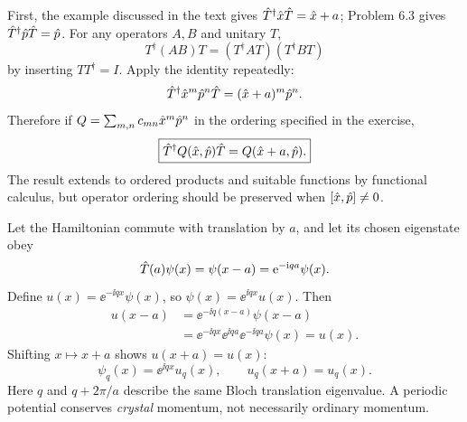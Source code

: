 First, the example discussed in the text gives
$\hat T^\dagger\hat x\hat T=\hat x+a$; Problem 6.3 gives
$\hat T^\dagger\hat p\hat T=\hat p$.
For any operators $A,B$ and unitary $T$,
\[
T^\dagger(AB)T=
(T^\dagger AT)(T^\dagger BT)
\]
by inserting $TT^\dagger=I$.
Apply the identity repeatedly:
\[
\hat T^\dagger \hat x^m\hat p^n\hat T
=(\hat x+a)^m\hat p^n.
\]
Therefore if $Q=\sum_{m,n}c_{mn}\hat x^m\hat p^n$
in the ordering specified in the exercise,
\begin{equation}
\boxed{\hat T^\dagger Q(\hat x,\hat p)\hat T
=Q(\hat x+a,\hat p).}
\end{equation}
The result extends to ordered products
and suitable functions by functional
calculus, but operator ordering should
be preserved when $[\hat x,\hat p]\ne0$.

Let the Hamiltonian commute with translation
by $a$, and let its chosen eigenstate obey
\[
\hat T(a)\psi(x)=\psi(x-a)
=\mathrm e^{-\mathrm i qa}\psi(x).
\]
Define $u(x)=\ee^{-\ii qx}\psi(x)$,
so $\psi(x)=\ee^{\ii qx}u(x)$.
Then
\begin{align}
u(x-a)
&=\ee^{-\ii q(x-a)}\psi(x-a)\\
&=\ee^{-\ii qx}\ee^{\ii qa}
\ee^{-\ii qa}\psi(x)
=u(x).
\end{align}
Shifting $x\mapsto x+a$ shows
$u(x+a)=u(x)$:
\begin{equation}
\boxed{\psi_q(x)=\ee^{\ii qx}u_q(x),
\qquad u_q(x+a)=u_q(x).}
\end{equation}
Here $q$ and $q+2\pi/a$ describe
the same Bloch translation eigenvalue.
A periodic potential conserves \emph{crystal}
momentum, not necessarily ordinary momentum.


